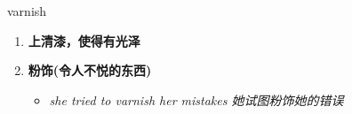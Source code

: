 
\begin{frame}
{\huge varnish}
\begin{center}
\begin{enumerate}\Large
  \item \textbf{上清漆，使得有光泽}
  \item \textbf{粉饰(令人不悦的东西)}
  \begin{itemize}
    \item \em{\Large{she tried to varnish her mistakes 她试图粉饰她的错误}}
  \end{itemize}
\end{enumerate}
\end{center}
\end{frame}

